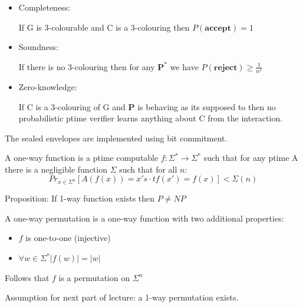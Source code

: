 \documentclass[a4paper,12pt]{article}
\theoremstyle{definition}
\theoremstyle{remark}
\begin{document}
\begin{itemize}
    \item Completeness:
    
    If G is 3-colourable and C is a 3-colouring then $P(\textbf{accept}) = 1$

    \item Soundness:
    
    If there is no 3-colouring then for any $\textbf{P}^*$ we have $P(\textbf{reject}) \geq \frac{1}{n^2}$

    \item Zero-knowledge:
    
    If C is a 3-colouring of G and \textbf{P} is behaving as its supposed to then no probabilistic ptime verifier learns anything about C from the interaction.
\end{itemize}

The sealed envelopes are implemented using bit commitment.

A one-way function is a ptime computable $f: \Sigma^* \to \Sigma^*$ such that for any ptime A there is a negligible function
$\Sigma$ such that for all $n$:
\begin{equation*}
    Pr_{x \in \Sigma^n} [A(f(x)) = x' s \cdot t f(x') = f(x)] < \Sigma(n)
\end{equation*}

Proposition: If 1-way function exists then $P \neq NP$

A one-way permutation is a one-way function with two additional properties:
\begin{itemize}
    \item $f$ is one-to-one (injective)
    \item $\forall w \in \Sigma^* |f(w)| = |w|$
\end{itemize}

Follows that $f$ is a permutation on $\Sigma^n$ %

Assumption for next part of lecture: a 1-way permutation exists.
\end{document}
